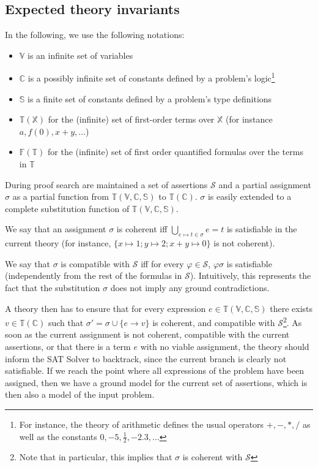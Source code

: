 \subsection{Expected theory invariants}

In the following, we use the following notations:
\begin{itemize}
  \item $\mathbb{V}$ is an infinite set of variables
  \item $\mathbb{C}$ is a possibly infinite set of constants defined
    by a problem's logic\footnote{For instance, the theory of arithmetic
    defines the usual operators $+, -, *, /$ as well as the constants
    $0, -5, \frac{1}{2}, -2.3, \ldots$}
  \item $\mathbb{S}$ is a finite set of constants defined by a problem's type definitions
  \item $\mathbb{T}(\mathbb{X})$ for the (infinite) set of first-order terms over $\mathbb{X}$
    (for instance $a, f(0), x + y, \ldots$)
  \item $\mathbb{F}(\mathbb{T})$ for the (infinite) set of first order quantified formulas
    over the terms in $\mathbb{T}$
\end{itemize}

During proof search are maintained a set of assertions $\mathcal{S}$
and a partial assignment $\sigma$ as a partial function from $\mathbb{T}(\mathbb{V, C, S})$
to $\mathbb{T}(\mathbb{C})$. $\sigma$ is easily extended to a complete substitution function of
$\mathbb{T}(\mathbb{V, C, S})$.

We say that an assignment $\sigma$ is coherent iff $\bigcup_{e\mapsto t \in \sigma} e = t$ is satisfiable
in the current theory (for instance, $\{x\mapsto 1; y \mapsto 2; x + y \mapsto 0\}$ is not coherent).

We say that $\sigma$ is compatible with $\mathcal{S}$ iff for every $\varphi \in \mathcal{S}$,
$\varphi\sigma$ is satisfiable (independently from the rest of the formulas in $\mathcal{S}$).
Intuitively, this represents the fact that the substitution $\sigma$ does not imply any
ground contradictions.

A theory then has to ensure that for every expression $e \in \mathbb{T}(\mathbb{V,C,S})$
there exists $v \in \mathbb{T}(\mathbb{C})$ such that $\sigma' = \sigma \cup \{ e \rightarrow v \}$
is coherent, and compatible with $\mathcal{S}$\footnote{Note that in particular, this implies
that $\sigma$ is coherent with $\mathcal{S}$}. As soon as the current assignment is not coherent,
compatible with the current assertions, or that there is a term $e$ with no viable assignment, the theory
should inform the SAT Solver to backtrack, since the current branch is clearly not satisfiable.
If we reach the point where all expressions of the problem have been assigned, then we
have a ground model for the current set of assertions, which is then also a model
of the input problem.

